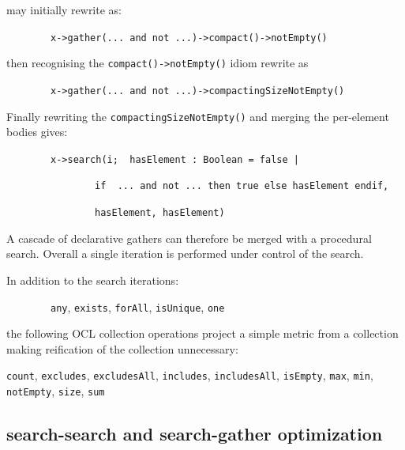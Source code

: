 \documentclass[
]{ceurart}
\begin{document}
may initially rewrite as:

\begin{description}[itemsep=-0.2cm]\small
\item ~~~~~~~~\verb!x->gather(... and not ...)->compact()->notEmpty()!
\end{description}

then recognising the \verb!compact()->notEmpty()! idiom rewrite as

\begin{description}[itemsep=-0.2cm]\small
\item ~~~~~~~~\verb!x->gather(... and not ...)->compactingSizeNotEmpty()!
\end{description}

Finally rewriting the \verb!compactingSizeNotEmpty()! and merging the per-element bodies gives:

\begin{description}[itemsep=-0.2cm]\small
\item ~~~~~~~~\verb!x->search(i;  hasElement : Boolean = false |!
\item ~~~~~~~~~~~~~~~~\verb!if  ... and not ... then true else hasElement endif,!
\item ~~~~~~~~~~~~~~~~\verb!hasElement, hasElement)!
\end{description}

A cascade of declarative gathers can therefore be merged with a procedural search. Overall a single iteration is performed under control of the search.

In addition to the search iterations: 
\begin{description}[itemsep=-0.2cm]\small
\item ~~~~~~~~\verb!any!, \verb!exists!, \verb!forAll!, \verb!isUnique!, \verb!one!
\end{description}
the following OCL collection operations project a simple metric from a collection making reification of the collection unnecessary:
\begin{description}[itemsep=-0.2cm]\small
\item \verb!count!, \verb!excludes!, \verb!excludesAll!, \verb!includes!, \verb!includesAll!, \verb!isEmpty!, \verb!max!, \verb!min!, \verb!notEmpty!, \verb!size!, \verb!sum!
\end{description}

\subsection{search-search and search-gather optimization}
\end{document}
